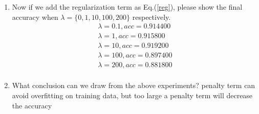 \documentclass[11pt]{article}
\begin{document}
\begin{enumerate}
\begin{enumerate}
		\item Now if we add the regularization term as Eq.(\ref{reg}), please show the final accuracy when $\lambda=\{0,1,10,100,200\}$ respectively.
		\begin{align*}
			\lambda = 0.1, acc = 0.914400\\
			\lambda = 1, acc = 0.915800\\
			\lambda = 10, acc = 0.919200\\
			\lambda = 100, acc = 0.897400\\
			\lambda = 200, acc = 0.881800\\
		\end{align*}
		\item What conclusion can we draw from the above experiments?
		penalty term can avoid overfitting on training data, but too large a penalty term will decrease the accuracy
	\end{enumerate}
\end{enumerate}
\end{document}
